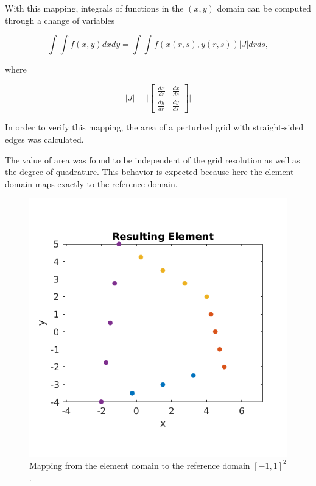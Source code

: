 \documentclass{article}
\begin{document}
\noindent With this mapping, integrals of functions in the $(x,y)$ domain can be computed through a change of variables

\begin{equation}
\int \int f(x,y) dx dy = \int \int f(x(r,s), y(r,s)) |J| dr ds,
\end{equation} 

where

\begin{equation*}
|J| =    \lvert \begin{bmatrix}
      \frac{dx}{dr} & \frac{dx}{ds}\\
      \frac{dy}{dr} & \frac{dy}{ds}
    \end{bmatrix} \rvert
\end{equation*}

In order to verify this mapping, the area of a perturbed grid with straight-sided edges was calculated. 

The value of area was found to be independent of the grid resolution as well as the degree of quadrature. This behavior is expected because here the element domain maps exactly to the reference domain.

\begin{figure}[H]
  \centering
  \includegraphics[scale=0.5]{media/5-2-rs.png}
  
  \caption{Mapping from the element domain to the reference domain $[-1,1]^2$.}
  \label{fig:spatDer}
\end{figure}
\end{document}
